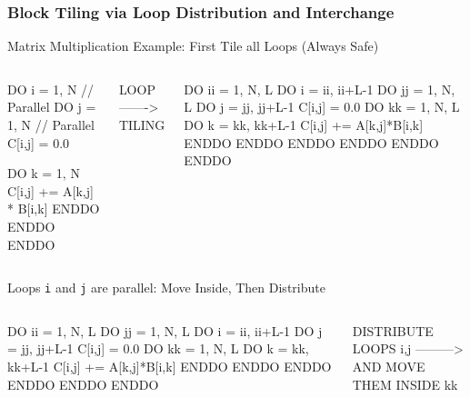 \documentclass{beamer}
\newcommand{\emp}[1]{\textcolor{DikuRed}{ #1}}
\newcommand{\emphh}[1]{\textcolor{CosGreen}{ #1}}
\begin{document}
\begin{frame}[fragile,t]
  \frametitle{Block Tiling via Loop Distribution and Interchange} %
\vspace{-2ex}
\begin{block}{Matrix Multiplication Example: First Tile all Loops (Always Safe)}
\begin{columns}
\vspace{-2ex}
\begin{colorcode}[fontsize=\scriptsize]
DO i = 1, N   \emphh{// Parallel}
  DO j = 1, N  \emphh{// Parallel}
    C[i,j] = 0.0
    
    DO k = 1, N
      C[i,j] += A[k,j] * B[i,k]
    ENDDO
  ENDDO
ENDDO
\end{colorcode} 
\vspace{-2ex}
\begin{colorcode}[fontsize=\scriptsize]
\emp{LOOP}
\emp{------->}
\emp{TILING}



\end{colorcode}
\vspace{-2ex}
\begin{colorcode}[fontsize=\scriptsize]
DO ii = 1, N, L  
  \emp{DO i = ii, ii+L-1} 
    DO jj = 1, N, L
      \emp{DO j = jj, jj+L-1}  
        C[i,j] = 0.0
        DO kk = 1, N, L
          \emp{DO k = kk, kk+L-1}
            C[i,j] += A[k,j]*B[i,k]
ENDDO ENDDO ENDDO ENDDO ENDDO ENDDO
\end{colorcode}
\end{columns}
\end{block}
\vspace{-2ex}
\begin{block}{Loops {\tt i} and {\tt j} are parallel: Move Inside, Then Distribute}
\begin{columns}
\vspace{-2ex}
\begin{colorcode}[fontsize=\scriptsize]
DO ii = 1, N, L  
  DO jj = 1, N, L
    \emp{DO i = ii, ii+L-1} 
      \emp{DO j = jj, jj+L-1}  
        C[i,j] = 0.0
        DO kk = 1, N, L
          DO k = kk, kk+L-1
            C[i,j] += A[k,j]*B[i,k]
ENDDO ENDDO ENDDO ENDDO ENDDO ENDDO
\end{colorcode} 
\vspace{-2ex}
\begin{colorcode}[fontsize=\scriptsize]
\emp{DISTRIBUTE}
\emp{LOOPS i,j}
\emp{--------->}
\emp{AND MOVE}
\emp{THEM}
\emp{INSIDE kk}





\end{colorcode}
\end{columns}
\end{block}
\end{frame}
\end{document}
